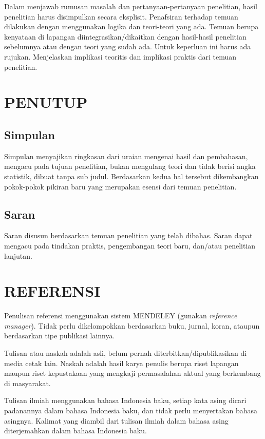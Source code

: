 Dalam menjawab rumusan masalah dan pertanyaan-pertanyaan penelitian, hasil
penelitian harus disimpulkan secara eksplisit. Penafsiran terhadap temuan dilakukan
dengan menggunakan logika dan teori-teori yang ada. Temuan berupa kenyataan di
lapangan diintegrasikan/dikaitkan dengan hasil-hasil penelitian sebelumnya atau
dengan teori yang sudah ada. Untuk keperluan ini harus ada rujukan. Menjelaskan
implikasi teoritis dan implikasi praktis dari temuan penelitian.

\section{PENUTUP}
\subsection{Simpulan}
Simpulan menyajikan ringkasan dari uraian mengenai hasil dan pembahasan,
mengacu pada tujuan penelitian, bukan mengulang teori dan tidak berisi angka statistik,
dibuat tanpa sub judul. Berdasarkan kedua hal tersebut dikembangkan pokok-pokok
pikiran baru yang merupakan esensi dari temuan penelitian.

\subsection{Saran}
Saran disusun berdasarkan temuan penelitian yang telah dibahas. Saran dapat
mengacu pada tindakan praktis, pengembangan teori baru, dan/atau penelitian lanjutan.

\section{REFERENSI}
\noindent Penulisan referensi menggunakan sistem MENDELEY (gunakan \textit{reference manager}).
Tidak perlu dikelompokkan berdasarkan buku, jurnal, koran, ataupun berdasarkan tipe
publikasi lainnya.

\vspace{4pt}
\noindent Tulisan atau naskah adalah asli, belum pernah diterbitkan/dipublikasikan di media
cetak lain. Naskah adalah hasil karya penulis berupa riset lapangan maupun riset kepustakaan
yang mengkaji permasalahan aktual yang berkembang di masyarakat.

\vspace{4pt}
\noindent Tulisan ilmiah menggunakan bahasa Indonesia baku, setiap kata asing dicari
padanannya dalam bahasa Indonesia baku, dan tidak perlu menyertakan bahasa
asingnya. Kalimat yang diambil dari tulisan ilmiah dalam bahasa asing diterjemahkan dalam
bahasa Indonesia baku.

